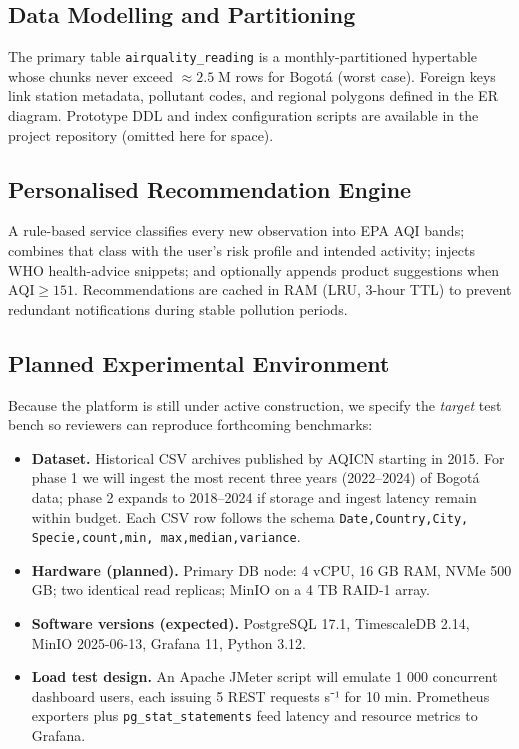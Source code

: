 \subsection{Data Modelling and Partitioning}\label{subsec:partitioning}
The primary table \texttt{airquality\_reading} is a monthly-partitioned hypertable whose chunks never exceed \(\approx\!2.5\;\mathrm{M}\) rows for Bogotá (worst case)\cite{timescale}.  
Foreign keys link station metadata, pollutant codes, and regional polygons defined in the ER diagram.  
Prototype DDL and index configuration scripts are available in the project repository (omitted here for space).

\subsection{Personalised Recommendation Engine}\label{subsec:reco}
A rule-based service classifies every new observation into EPA AQI bands\cite{epaaqi}; combines that class with the user’s risk profile and intended activity; injects WHO health-advice snippets\cite{whoaq}; and optionally appends product suggestions when \(\text{AQI}\ge151\).  
Recommendations are cached in RAM (LRU, 3-hour TTL) to prevent redundant notifications during stable pollution periods.

\subsection{Planned Experimental Environment}\label{subsec:experiment}
Because the platform is still under active construction, we specify the \textit{target} test bench so reviewers can reproduce forthcoming benchmarks:

\begin{itemize}
  \item \textbf{Dataset.} Historical CSV archives published by AQICN starting in 2015\cite{aqicnhist}.  
        For phase 1 we will ingest the most recent three years (2022–2024) of Bogotá data; phase 2 expands to 2018–2024 if storage and ingest latency remain within budget.
        Each CSV row follows the schema
        \texttt{Date,Country,City, Specie,count,min, max,median,variance}.
  \item \textbf{Hardware (planned).} Primary DB node: 4 vCPU, 16 GB RAM, NVMe 500 GB; two identical read replicas; MinIO on a 4 TB RAID-1 array.
  \item \textbf{Software versions (expected).} PostgreSQL 17.1, TimescaleDB 2.14, MinIO 2025-06-13, Grafana 11, Python 3.12.
  \item \textbf{Load test design.} An Apache JMeter script will emulate 1 000 concurrent dashboard users, each issuing 5 REST requests s⁻¹ for 10 min\cite{jmeter}.  
        Prometheus exporters plus \texttt{pg\_stat\_statements} feed latency and resource metrics to Grafana\cite{grafana}.
\end{itemize}